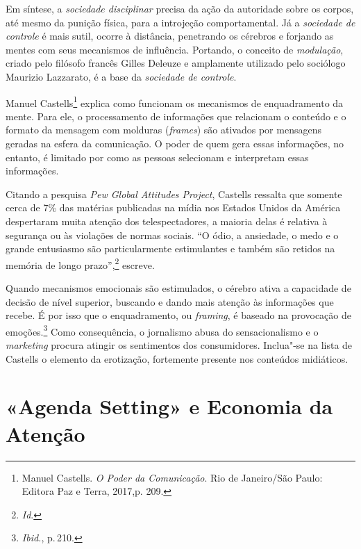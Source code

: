 Em síntese, a \emph{sociedade disciplinar} precisa da ação da autoridade
sobre os corpos, até mesmo da punição física, para a introjeção
comportamental. Já a \emph{sociedade de controle} é mais sutil, ocorre à
distância, penetrando os cérebros e forjando as mentes com seus
mecanismos de influência. Portando, o conceito de \emph{modulação},
criado pelo filósofo francês Gilles Deleuze e amplamente utilizado pelo
sociólogo Maurizio Lazzarato, é a base da \emph{sociedade de controle}.

Manuel Castells\footnote{Manuel Castells. \emph{O Poder da Comunicação}.
Rio de Janeiro/São Paulo: Editora Paz e Terra, 2017,p. 209.} explica como funcionam os mecanismos de
enquadramento da mente. Para ele, o processamento de informações que
relacionam o conteúdo e o formato da mensagem com molduras
(\emph{frames}) são ativados por mensagens geradas na esfera da
comunicação. O poder de quem gera essas informações, no entanto, é
limitado por como as pessoas selecionam e interpretam essas informações.

Citando a pesquisa \emph{Pew Global Attitudes Project}, Castells
ressalta que somente cerca de 7\% das matérias publicadas na mídia nos
Estados Unidos da América despertaram muita atenção dos telespectadores,
a maioria delas é relativa à segurança ou às violações de normas
sociais. ``O ódio, a ansiedade, o medo e o grande entusiasmo são
particularmente estimulantes e também são retidos na memória de longo
prazo'',\footnote{\textit{Id}.} escreve. 

Quando mecanismos emocionais
são estimulados, o cérebro ativa a capacidade de decisão de nível
superior, buscando e dando mais atenção às informações que recebe. É por
isso que o enquadramento, ou \emph{framing}, é baseado na provocação de
emoções.\footnote{\emph{Ibid.}, p.\,210.} Como consequência, o jornalismo abusa do
sensacionalismo e o \emph{marketing} procura atingir os sentimentos dos
consumidores. Inclua"-se na lista de Castells o elemento da erotização,
fortemente presente nos conteúdos midiáticos.

\section{«Agenda Setting» e Economia da Atenção}

